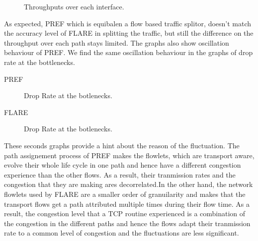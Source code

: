  \begin{figure}[h!]
 \begin{center}
\caption{
  Throughputs over each interface.
    \label{fig:equal-thro-flare}
}
\end{center}

\end{figure}


As expected, PREF which is equibalen a flow based traffic splitor, doesn't match the accuracy level of FLARE in splitting the traffic, but still the difference on the throughput over each path stays limited. The graphs also show oscillation behaviour of PREF. We find the same oscillation behaviour in the graphs of drop rate at the bottlenecks.

PREF

\begin{figure}[h]
 \begin{center}

\caption{
  Drop Rate at the botlenecks.
    \label{fig:equal-thro-pref}
}
\end{center}



\end{figure}
FLARE
 \begin{figure}[h!]
 \begin{center}
\caption{
  Drop Rate at the botlenecks.
    \label{fig:equal-thro-flare}
}
\end{center}

\end{figure}

These seconds graphs provide a hint about the reason of the fluctuation. The path assignement process of PREF makes the flowlets, which are transport aware, evolve their whole life cycle in one path and hence have a different congestion experience than the other flows. As a result, their tranmission rates and the congestion that they are making ares decorrelated.In the other hand, the network flowlets used by FLARE are a smaller order of granuilarity and makes that the transport flows get a path attributed multiple times during their flow time. As a result, the congestion level that a TCP routine experienced is a combination of the congestion in the different paths and hence the flows adapt their tranmission rate to a common level of congestion and the fluctuations are less significant.

